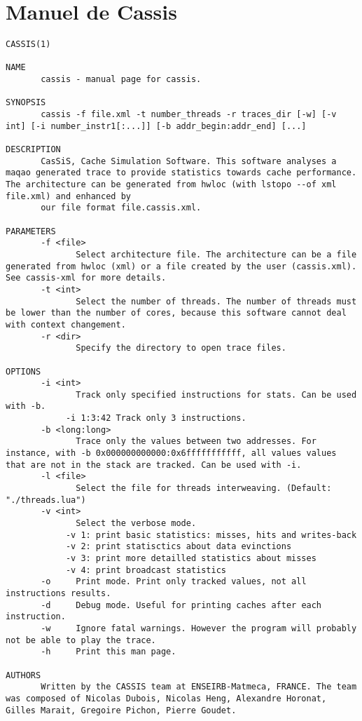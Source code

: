 \section{Manuel de Cassis}
\begin{lstlisting}[style=styleMan]
CASSIS(1)

NAME
       cassis - manual page for cassis.

SYNOPSIS
       cassis -f file.xml -t number_threads -r traces_dir [-w] [-v int] [-i number_instr1[:...]] [-b addr_begin:addr_end] [...]

DESCRIPTION
       CasSiS, Cache Simulation Software. This software analyses a maqao generated trace to provide statistics towards cache performance. The architecture can be generated from hwloc (with lstopo --of xml file.xml) and enhanced by
       our file format file.cassis.xml.

PARAMETERS
       -f <file>
              Select architecture file. The architecture can be a file generated from hwloc (xml) or a file created by the user (cassis.xml). See cassis-xml for more details.
       -t <int>
              Select the number of threads. The number of threads must be lower than the number of cores, because this software cannot deal with context changement.
       -r <dir>
              Specify the directory to open trace files.

OPTIONS
       -i <int>
              Track only specified instructions for stats. Can be used with -b.
            -i 1:3:42 Track only 3 instructions.
       -b <long:long>
              Trace only the values between two addresses. For instance, with -b 0x000000000000:0x6fffffffffff, all values values that are not in the stack are tracked. Can be used with -i.
       -l <file>
              Select the file for threads interweaving. (Default: "./threads.lua")
       -v <int>
              Select the verbose mode.
            -v 1: print basic statistics: misses, hits and writes-back
            -v 2: print statisctics about data evinctions
            -v 3: print more detailled statistics about misses
            -v 4: print broadcast statistics
       -o     Print mode. Print only tracked values, not all instructions results.
       -d     Debug mode. Useful for printing caches after each instruction.
       -w     Ignore fatal warnings. However the program will probably not be able to play the trace.
       -h     Print this man page.

AUTHORS
       Written by the CASSIS team at ENSEIRB-Matmeca, FRANCE. The team was composed of Nicolas Dubois, Nicolas Heng, Alexandre Horonat, Gilles Marait, Gregoire Pichon, Pierre Goudet.


\end{lstlisting}
